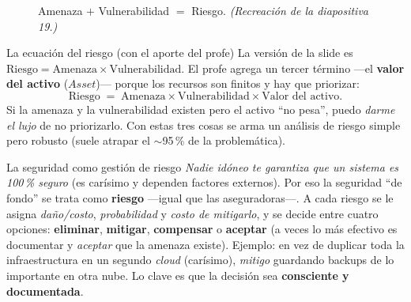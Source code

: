 \documentclass[11pt,a4paper]{article}
\begin{document}
\begin{figure}[h]
\centering
{}
\caption{Amenaza $+$ Vulnerabilidad $=$ Riesgo. \textit{(Recreación de la diapositiva 19.)}}
\end{figure}

\begin{defbox}{La ecuación del riesgo (con el aporte del profe)}
La versión de la slide es $\text{Riesgo} = \text{Amenaza} \times \text{Vulnerabilidad}$. El
profe agrega un tercer término —el \textbf{valor del activo} ($Asset$)— porque los recursos son
finitos y hay que priorizar:
\[
  \text{Riesgo} \;=\; \text{Amenaza} \times \text{Vulnerabilidad} \times \text{Valor del activo}.
\]
Si la amenaza y la vulnerabilidad existen pero el activo ``no pesa'', puedo \emph{darme el lujo}
de no priorizarlo. Con estas tres cosas se arma un análisis de riesgo simple pero robusto (suele
atrapar el $\sim$95\,\% de la problemática).
\end{defbox}

\begin{practbox}{La seguridad como gestión de riesgo}
\emph{Nadie idóneo te garantiza que un sistema es 100\,\% seguro} (es carísimo y dependen
factores externos). Por eso la seguridad ``de fondo'' se trata como \textbf{riesgo} —igual que
las aseguradoras—. A cada riesgo se le asigna \emph{daño/costo}, \emph{probabilidad} y
\emph{costo de mitigarlo}, y se decide entre cuatro opciones:
\textbf{eliminar}, \textbf{mitigar}, \textbf{compensar} o \textbf{aceptar} (a veces lo más
efectivo es documentar y \emph{aceptar} que la amenaza existe). Ejemplo: en vez de duplicar
toda la infraestructura en un segundo \emph{cloud} (carísimo), \emph{mitigo} guardando backups
de lo importante en otra nube. Lo clave es que la decisión sea \textbf{consciente y
documentada}.
\end{practbox}
\end{document}
